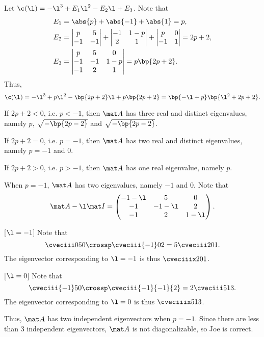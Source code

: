 \begin{solution}
    \begin{ppart}
        Let $\c(\l) = -\l^3 + E_1 \l^2 - E_2 \l + E_3$. Note that
        \begin{align*}
            E_1 &= \abs{p} + \abs{-1} + \abs{1} = p,\\
            E_2 &= \begin{vmatrix}p & 5 \\ -1 & - 1\end{vmatrix} + \begin{vmatrix}-1 & 1-p \\ 2 & 1\end{vmatrix} + \begin{vmatrix}p & 0 \\ -1 & 1\end{vmatrix} = 2p+2,\\
            E_3 &= \begin{vmatrix}p & 5 & 0 \\ -1 & - 1 & 1 - p \\ -1 & 2 & 1\end{vmatrix} = p\bp{2p+2}.
        \end{align*}
        Thus, \[\c(\l) = -\l^3 + p\l^2 - \bp{2p+2}\l + p \bp{2p+2} = \bp{-\l + p} \bp{\l^2 + 2p + 2}.\]

         If $2p + 2 < 0$, i.e. $p < -1$, then $\mat A$ has three real and distinct eigenvalues, namely $p$, $\sqrt{-\bp{2p- 2}}$ and $\sqrt{-\bp{2p-2}}$.

         If $2p + 2 = 0$, i.e. $p = -1$, then $\mat A$ has two real and distinct eigenvalues, namely $p = -1$ and $0$.

         If $2p + 2 > 0$, i.e. $p > -1$, then $\mat A$ has one real eigenvalue, namely $p$.
    \end{ppart}
    \begin{ppart}
        When $p = -1$, $\mat A$ has two eigenvalues, namely $-1$ and $0$. Note that \[\mat A - \l \mat I = \begin{pmatrix}-1-\l & 5 & 0 \\ -1 & - 1-\l & 2 \\ -1 & 2 & 1-\l\end{pmatrix}.\]

        [$\l = -1$] Note that \[\cveciii050 \crossp \cveciii{-1}02 = 5\cveciii201.\] The eigenvector corresponding to $\l = -1$ is thus $\cveciiix201$.

        [$\l = 0$] Note that \[\cveciii{-1}50 \crossp \cveciii{-1}{-1}{2} = 2\cveciii513.\] The eigenvector corresponding to $\l = 0$ is thus $\cveciiix513$.

        Thus, $\mat A$ has two independent eigenvectors when $p = -1$. Since there are less than 3 independent eigenvectors, $\mat A$ is not diagonalizable, so Joe is correct.
    \end{ppart}
\end{solution}